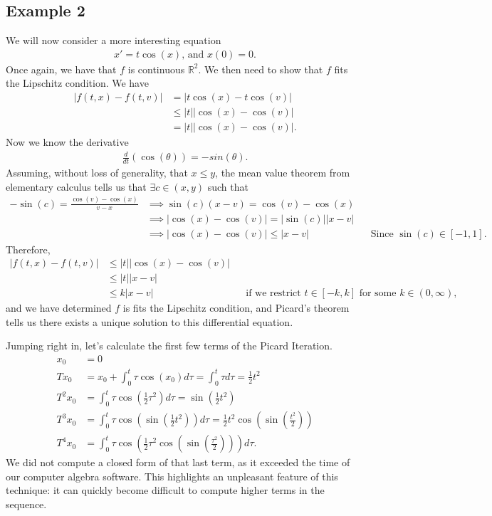\documentclass[10pt,a4paper]{article}
\theoremstyle{theorem}
\theoremstyle{definition}
\begin{document}
\subsection*{Example 2}
We will now consider a more interesting equation
\begin{align*}
x' = t \cos(x) \text{, and } x(0) = 0.
\end{align*}
Once again, we have that $f$ is continuous $\mathbb{R}^2$. We then need to show that $f$ fits the Lipschitz condition. We have
\begin{align*}
|f(t, x) - f(t, v)| &= |t \cos(x) - t \cos(v)|\\
&\leq |t| |\cos(x) - \cos(v)| \\
&= |t| |\cos(x) - \cos(v)|.
\end{align*}
Now we know the derivative
\begin{align*}
\frac{d}{d t} (\cos(\theta)) = -sin(\theta).
\end{align*}
Assuming, without loss of generality, that $x \leq y$, the mean value theorem from elementary calculus tells us that $\exists c \in (x, y)$ such that
\begin{align*}
-\sin(c) = \frac{\cos(v) - \cos(x)}{v - x} &\implies \sin(c) (x - v) = \cos(v) - \cos(x)\\
&\implies |\cos(x) - \cos(v)| = |\sin(c)| |x - v|\\
&\implies |\cos(x) - \cos(v)| \leq |x - v| && \text{Since } \sin(c) \in [-1, 1].
\end{align*}
Therefore, 
\begin{align*}
|f(t, x) - f(t, v)| &\leq |t| |\cos(x) - \cos(v)| \\
&\leq |t| |x - v|\\
&\leq k |x - v| && \text{if we restrict } t \in [-k, k] \text{ for some } k \in (0, \infty),
\end{align*}
and we have determined $f$ is fits the Lipschitz condition, and Picard's theorem tells us there exists a unique solution to this differential equation. 

Jumping right in, let's calculate the first few terms of the Picard Iteration.
\begin{align*}
x_0 &= 0\\
Tx_0 &= x_0 + \int_{0}^t \tau \cos(x_0) d \tau = \int_{0}^t \tau d \tau = \frac{1}{2} t^2\\
T^2 x_0 &= \int_{0}^t \tau \cos \left( \frac{1}{2} \tau^2 \right) d \tau = \sin \left( \frac{1}{2} t^2 \right)  \\
T^3 x_0 &= \int_{0}^t \tau \cos \left(\sin \left( \frac{1}{2} t^2 \right)  \right) d \tau = \frac{1}{2} t^2 \cos \left( \sin \left(\frac{t^2}{2} \right) \right) \\
T^4 x_0 &= \int_{0}^t \tau \cos \left(  \frac{1}{2} \tau^2 \cos \left( \sin \left(\frac{\tau^2}{2} \right) \right)\right) d \tau.
\end{align*}
We did not compute a closed form of that last term, as it exceeded the time of our computer algebra software. This highlights an unpleasant feature of this technique: it can quickly become difficult to compute higher terms in the sequence.
\end{document}

